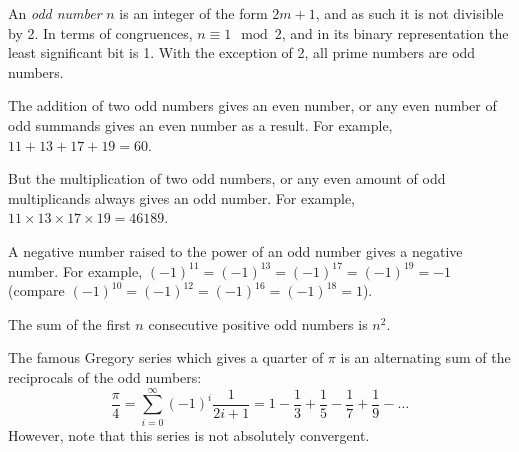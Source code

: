 \documentclass[12pt]{article}
\begin{document}
An {\em odd number} $n$ is an integer of the form $2m + 1$, and as such it is not divisible by 2. In terms of congruences, $n \equiv 1 \mod 2$, and in its binary representation the least significant bit is 1. With the exception of 2, all prime numbers are odd numbers.

The addition of two odd numbers gives an even number, or any even number of odd summands gives an even number as a result. For example, $11 + 13 + 17 + 19 = 60$.

But the multiplication of two odd numbers, or any even amount of odd multiplicands always gives an odd number. For example, $11 \times 13 \times 17 \times 19 = 46189$.

A negative number raised to the power of an odd number gives a negative number. For example, $(-1)^{11} = (-1)^{13} = (-1)^{17} = (-1)^{19} = -1$ (compare $(-1)^{10} = (-1)^{12} = (-1)^{16} = (-1)^{18} = 1$).

The sum of the first $n$ consecutive positive odd numbers is $n^2$.

The famous Gregory series which gives a quarter of $\pi$ is an alternating sum of the reciprocals of the odd numbers: $$\frac{\pi}{4} = \sum_{i = 0}^\infty (-1)^i \frac{1}{2i + 1} = 1 - \frac{1}{3} + \frac{1}{5} - \frac{1}{7} + \frac{1}{9} - \ldots$$ However, note that this series is not absolutely convergent.

\end{document}

